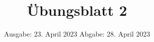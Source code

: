

\title{Übungsblatt 2}
\date{%
  Ausgabe: 23. April 2023 %
  \hspace{3em}
  Abgabe:  28. April 2023 %
}



\maketitle
\thispagestyle{empty}
\tableofcontents
\newpage







